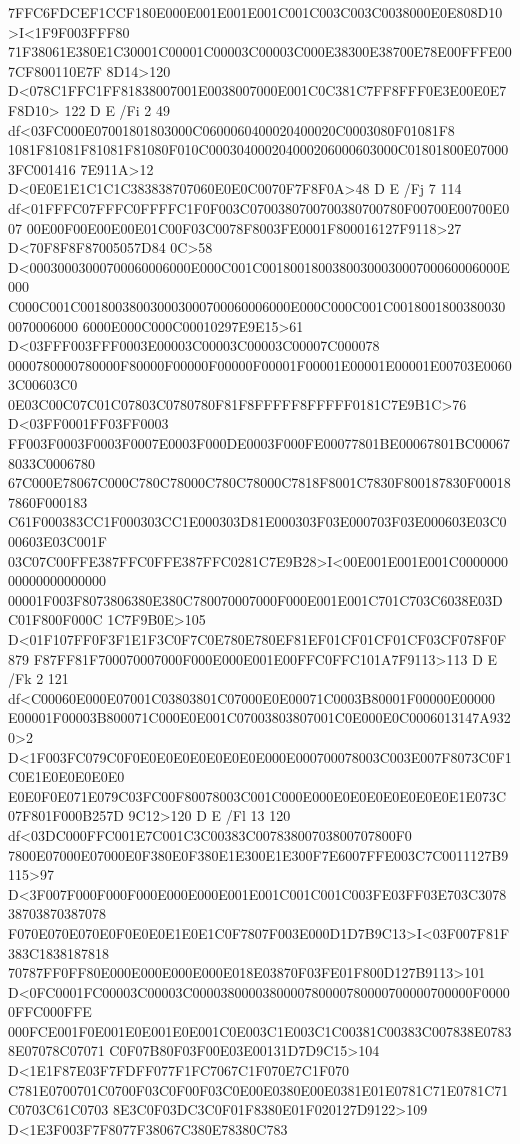 7FFC6FDCEF1CCF180E000E001E001E001C001C003C003C0038000E0E808D10>I<1F9F003FFF80
71F38061E380E1C30001C00001C00003C00003C000E38300E38700E78E00FFFE007CF800110E7F
8D14>120 D<078C1FFC1FF81838007001E0038007000E001C0C381C7FF8FFF0E3E00E0E7F8D10>
122 D E /Fi 2 49 df<03FC000E07001801803000C0600060400020400020C0003080F01081F8
1081F81081F81081F81080F010C000304000204000206000603000C01801800E070003FC001416
7E911A>12 D<0E0E1E1C1C1C383838707060E0E0C0070F7F8F0A>48 D E
/Fj 7 114 df<01FFFC07FFFC0FFFFC1F0F003C0700380700700380700780F00700E00700E007
00E00F00E00E00E01C00F03C0078F8003FE0001F800016127F9118>27 D<70F8F8F87005057D84
0C>58 D<00030003000700060006000E000C001C0018001800380030003000700060006000E000
C000C001C001800380030003000700060006000E000C000C001C00180018003800300070006000
6000E000C000C00010297E9E15>61 D<03FFF003FFF0003E00003C00003C00003C00007C000078
0000780000780000F80000F00000F00000F00001F00001E00001E00001E00703E00603C00603C0
0E03C00C07C01C07803C0780780F81F8FFFFF8FFFFF0181C7E9B1C>76 D<03FF0001FF03FF0003
FF003F0003F0003F0007E0003F000DE0003F000FE00077801BE00067801BC000678033C0006780
67C000E78067C000C780C78000C780C78000C7818F8001C7830F800187830F000187860F000183
C61F000383CC1F000303CC1E000303D81E000303F03E000703F03E000603E03C000603E03C001F
03C07C00FFE387FFC0FFE387FFC0281C7E9B28>I<00E001E001E001C000000000000000000000
00001F003F8073806380E380C780070007000F000E001E001C701C703C6038E03DC01F800F000C
1C7F9B0E>105 D<01F107FF0F3F1E1F3C0F7C0E780E780EF81EF01CF01CF01CF03CF078F0F879
F87FF81F700070007000F000E000E001E00FFC0FFC101A7F9113>113 D
E /Fk 2 121 df<C00060E000E07001C03803801C07000E0E00071C0003B80001F00000E00000
E00001F00003B800071C000E0E001C07003803807001C0E000E0C0006013147A9320>2
D<1F003FC079C0F0E0E0E0E0E0E0E0E000E000700078003C003E007F8073C0F1C0E1E0E0E0E0E0
E0E0F0E071E079C03FC00F80078003C001C000E000E0E0E0E0E0E0E0E1E073C07F801F000B257D
9C12>120 D E /Fl 13 120 df<03DC000FFC001E7C001C3C00383C00783800703800707800F0
7800E07000E07000E0F380E0F380E1E300E1E300F7E6007FFE003C7C0011127B9115>97
D<3F007F000F000F000E000E000E001E001C001C001C003FE03FF03E703C307838703870387078
F070E070E070E0F0E0E0E1E0E1C0F7807F003E000D1D7B9C13>I<03F007F81F383C1838187818
70787FF0FF80E000E000E000E000E018E03870F03FE01F800D127B9113>101
D<0FC0001FC00003C00003C0000380000380000780000780000700000700000F00000FFC000FFE
000FCE001F0E001E0E001E0E001C0E003C1E003C1C00381C00383C007838E07838E07078C07071
C0F07B80F03F00E03E00131D7D9C15>104 D<1E1F87E03F7FDFF077F1FC7067C1F070E7C1F070
C781E0700701C0700F03C0F00F03C0E00E0380E00E0381E01E0781C71E0781C71C0703C61C0703
8E3C0F03DC3C0F01F8380E01F020127D9122>109 D<1E3F003F7F8077F38067C380E78380C783
